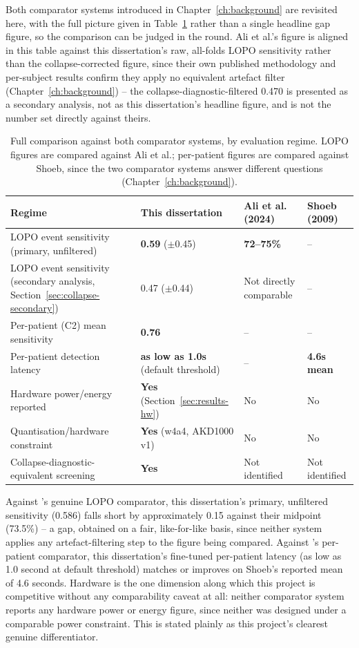 Both comparator systems introduced in Chapter~\ref{ch:background} are revisited here, with the full picture given in Table~\ref{tab:comparator-full} rather than a single headline gap figure, so the comparison can be judged in the round. Ali et al.'s figure is aligned in this table against this dissertation's raw, all-folds LOPO sensitivity rather than the collapse-corrected figure, since their own published methodology and per-subject results confirm they apply no equivalent artefact filter (Chapter~\ref{ch:background}) -- 
the collapse-diagnostic-filtered 0.470 is presented as a secondary analysis, not as this dissertation's headline figure, and is not the number set directly against theirs.
\begin{table}[H]
\centering
\small
\caption{Full comparison against both comparator systems, by evaluation regime. LOPO figures are compared against Ali et al.; per-patient figures are compared against Shoeb, since the two comparator systems answer different questions (Chapter~\ref{ch:background}).}
\label{tab:comparator-full}
\begin{tabular}{p{4cm}p{3cm}p{3cm}p{3cm}}
\toprule
Regime & This dissertation & Ali et al. (2024) & Shoeb (2009) \\
\midrule
LOPO event sensitivity (primary, unfiltered) & \textbf{0.59} ($\pm$0.45) & \textbf{72--75\%} & -- \\
\midrule
LOPO event sensitivity (secondary analysis, Section~\ref{sec:collapse-secondary}) & 0.47 ($\pm$0.44) & Not directly comparable & -- \\
\midrule
Per-patient (C2) mean sensitivity & \textbf{0.76} & -- & -- \\
\midrule
Per-patient detection latency & \textbf{as low as 1.0s} (default threshold) & -- & \textbf{4.6s mean} \\
\midrule
Hardware power/energy reported & \textbf{Yes} (Section~\ref{sec:results-hw}) & No & No \\
\midrule
Quantisation/hardware constraint & \textbf{Yes} (w4a4, AKD1000 v1) & No & No \\
\midrule
Collapse-diagnostic-equivalent screening & \textbf{Yes} & Not identified & Not identified \\
\bottomrule
\end{tabular}
\end{table}

Against \citet{ali2024}'s genuine LOPO comparator, this dissertation's primary, unfiltered sensitivity (0.586) falls short by approximately 0.15 against their midpoint (73.5\%) -- a gap, obtained on a fair, like-for-like basis, since neither system applies any artefact-filtering step to the figure being compared.
Against \citet{shoeb2009}'s per-patient comparator, this dissertation's fine-tuned per-patient latency (as low as 1.0 second at default threshold) matches or improves on Shoeb's reported mean of 4.6 seconds. Hardware is the one dimension along which this project is competitive without any comparability caveat at all: neither comparator system reports any hardware power or energy figure, since neither was designed under a comparable power constraint. This is stated plainly as this project's clearest genuine differentiator.


